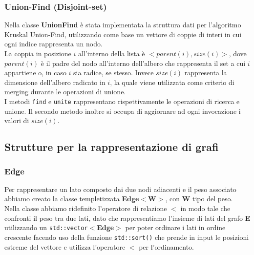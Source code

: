 \documentclass[]{article}
\begin{document}
\subsubsection{Union-Find (Disjoint-set)}
Nella classe \textbf{UnionFind} è stata implementata la struttura dati per l'algoritmo Kruskal Union-Find, utilizzando come base un vettore di coppie di interi in cui ogni indice rappresenta un nodo.\\
La coppia in posizione $i$ all'interno della lista è $<parent(i), size(i)>$, dove $parent(i)$ è il padre del nodo all'interno dell'albero che rappresenta il set a cui $i$ appartiene o, in caso $i$ sia radice, se stesso. Invece $size(i)$ rappresenta la dimensione dell'albero radicato in $i$, la quale viene utilizzata come criterio di merging durante le operazioni di unione.\\
I metodi \verb|find| e \verb|unite| rappresentano rispettivamente le operazioni di ricerca e unione. Il secondo metodo inoltre si occupa di aggiornare ad ogni invocazione i valori di $size(i)$.
\subsection{Strutture per la rappresentazione di grafi}
\subsubsection{Edge}
Per rappresentare un lato composto dai due nodi adiacenti e il peso associato abbiamo creato la classe templetizzata \textbf{Edge$<$W$>$}, con \textbf{W} tipo del peso.\\
Nella classe abbiamo ridefinito l'operatore di relazione \textbf{$<$} in modo tale che confronti il peso tra due lati, dato che rappresentiamo l'insieme di lati del grafo \textbf{E} utilizzando un \verb|std::vector|$<$\textbf{Edge}$>$ per poter ordinare i lati in ordine crescente facendo uso della funzione \verb|std::sort()| che prende in input le posizioni estreme del vettore e utilizza l'operatore \textbf{$<$} per l'ordinamento.
\end{document}
